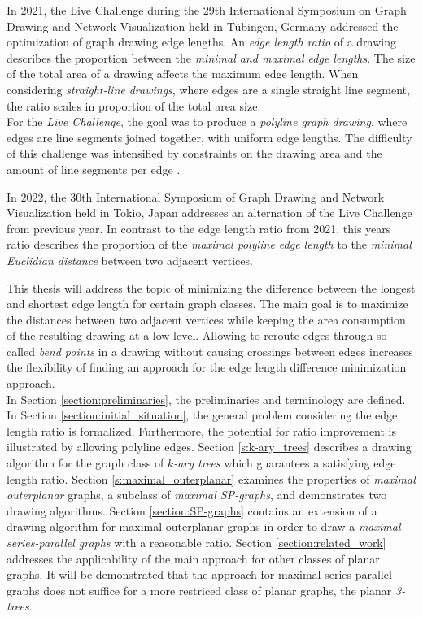 \bigskip

In 2021, the Live Challenge during the 29th International Symposium on Graph Drawing and Network Visualization held in Tübingen, Germany addressed the optimization of graph drawing edge lengths. An \emph{edge length ratio} of a drawing describes the proportion between the \emph{minimal and maximal edge lengths}. The size of the total area of a drawing affects the maximum edge length. When considering \emph{straight-line drawings}, where edges are a single straight line segment, the ratio scales in proportion of the total area size.\\
For the \emph{Live Challenge}, the goal was to produce a \emph{polyline graph drawing}, where edges are line segments joined together, with uniform edge lengths. 
The difficulty of this challenge was intensified by constraints on the drawing area and the amount of line segments per edge \cite{GD:2021_Challenge}.

\bigskip


In 2022, the 30th International Symposium of Graph Drawing and Network Visualization held in Tokio, Japan \cite{GD:2022_Challenge} addresses an alternation of the Live Challenge from previous year. In contrast to the edge length ratio from 2021, this years ratio describes the proportion of the \emph{maximal polyline edge length} to the \emph{minimal Euclidian distance} between two adjacent vertices. 

\bigskip


This thesis will address the topic of minimizing the difference between the longest and shortest edge length for certain graph classes. The main goal is to maximize the distances between two adjacent vertices while keeping the area consumption of the resulting drawing at a low level. Allowing to reroute edges through so-called \emph{bend points} in a drawing without causing crossings between edges increases the flexibility of finding an approach for the edge length difference minimization approach.\\
In Section \ref{section:preliminaries}, the preliminaries and terminology are defined. 
In Section \ref{section:initial_situation}, the general problem considering the edge length ratio is formalized. Furthermore, the potential for ratio improvement is illustrated by allowing polyline edges. 
Section \ref{s:k-ary_trees} describes a drawing algorithm for the graph class of \emph{$k$-ary trees} which guarantees a satisfying edge length ratio.
Section \ref{s:maximal_outerplanar} examines the properties of \emph{maximal outerplanar} graphs, a subclass of \emph{maximal SP-graphs}, and demonstrates two drawing algorithms.
Section \ref{section:SP-graphs} contains an extension of a drawing algorithm for maximal outerplanar graphs in order to draw a \emph{maximal series-parallel graphs} with a reasonable ratio. 
Section \ref{section:related_work} addresses the applicability of the main approach for other classes of planar graphs. It will be demonstrated that the approach for maximal series-parallel graphs does not suffice for a more restriced class of planar graphs, the planar \emph{3-trees}.